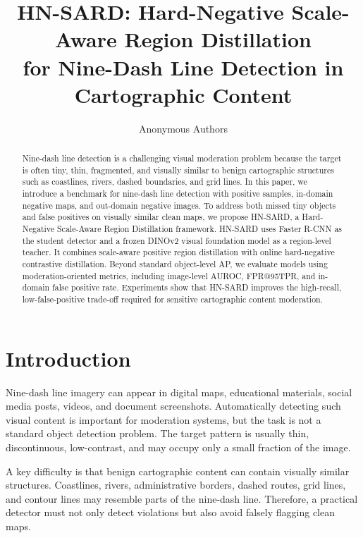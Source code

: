 \documentclass[conference,a4paper]{IEEEtran}
\title{
HN-SARD: Hard-Negative Scale-Aware Region Distillation\\
for Nine-Dash Line Detection in Cartographic Content
}
\author{
Anonymous Authors
}
\date{}
\begin{document}
\maketitle

\begin{abstract}
Nine-dash line detection is a challenging visual moderation problem because the target is often tiny, thin, fragmented, and visually similar to benign cartographic structures such as coastlines, rivers, dashed boundaries, and grid lines.
In this paper, we introduce a benchmark for nine-dash line detection with positive samples, in-domain negative maps, and out-domain negative images.
To address both missed tiny objects and false positives on visually similar clean maps, we propose HN-SARD, a Hard-Negative Scale-Aware Region Distillation framework.
HN-SARD uses Faster R-CNN as the student detector and a frozen DINOv2 visual foundation model as a region-level teacher.
It combines scale-aware positive region distillation with online hard-negative contrastive distillation.
Beyond standard object-level AP, we evaluate models using moderation-oriented metrics, including image-level AUROC, FPR@95TPR, and in-domain false positive rate.
Experiments show that HN-SARD improves the high-recall, low-false-positive trade-off required for sensitive cartographic content moderation.
\end{abstract}

\section{Introduction}

Nine-dash line imagery can appear in digital maps, educational materials, social media posts, videos, and document screenshots.
Automatically detecting such visual content is important for moderation systems, but the task is not a standard object detection problem.
The target pattern is usually thin, discontinuous, low-contrast, and may occupy only a small fraction of the image.

A key difficulty is that benign cartographic content can contain visually similar structures.
Coastlines, rivers, administrative borders, dashed routes, grid lines, and contour lines may resemble parts of the nine-dash line.
Therefore, a practical detector must not only detect violations but also avoid falsely flagging clean maps.
\end{document}
